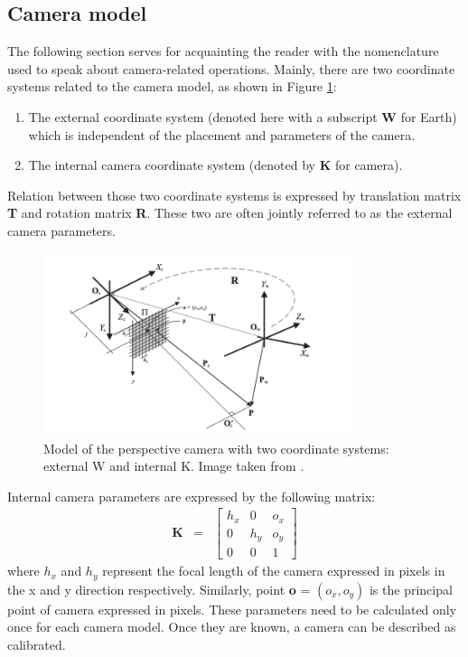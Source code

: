 \subsection{Camera model}
The following section serves for acquainting the reader with the nomenclature used to speak about camera-related operations. Mainly, there are two coordinate systems related to the camera model, as shown in Figure \ref{fig:camera_model}:
\begin{enumerate} 
\item The external coordinate system (denoted here with a subscript \textbf{W} for Earth) which is independent of the placement and parameters of the camera.
\item The internal camera coordinate system (denoted by \textbf{K} for camera).
\end{enumerate}
Relation between those two coordinate systems is expressed by translation matrix \textbf{T} and rotation matrix \textbf{R}. These two are often jointly referred to as the external camera parameters.
\begin{figure}[h!]
    \centering
    \includegraphics[width=0.8\textwidth]{camera_model}
    \caption{Model of the perspective camera with two coordinate systems: external W and
internal K. Image taken from \cite{Cyganek3dVision}.}
    \label{fig:camera_model}
\end{figure}
Internal camera parameters are expressed by the following matrix:
\begin{equation}
\begin{array}{lcl}
\textbf{K} & = &
\begin{bmatrix}
h_{x} & 0 & o_{x} \\ 
0 & h_{y} & o_{y} \\ 
0 & 0 & 1
\end{bmatrix}
\end{array}
\end{equation}
where $h_{x}$ and $h_{y}$ represent the focal length of the camera expressed in pixels in the x and y direction respectively. Similarly, point \textbf{o} = $(o_{x},o_{y})$ is the principal point of camera expressed in pixels. These parameters need to be calculated only once for each camera model. Once they are known, a camera can be described as calibrated. 
